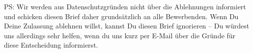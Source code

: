 PS: Wir werden aus Datenschutzgründen nicht über die Ablehnungen informiert und schicken diesen
Brief daher grundsätzlich an alle Bewerbenden. Wenn Du Deine Zulassung ablehnen willst, kannst Du diesen Brief
ignorieren -- Du würdest uns allerdings sehr helfen, wenn du uns
kurz per E-Mail über die Gründe für diese Entscheidung informierst.

